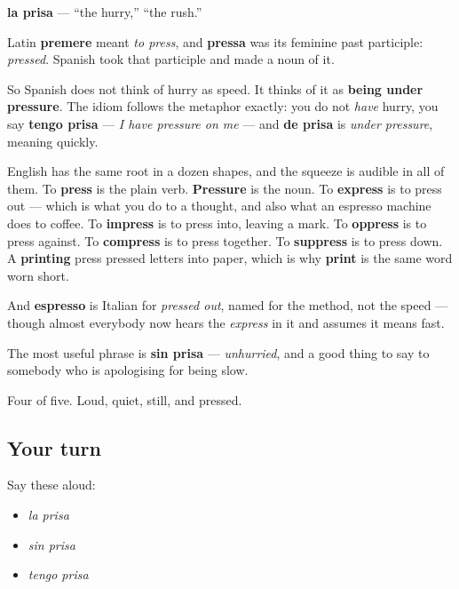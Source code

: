 \begin{cousinweb}
\textbf{la prisa} — \textquotedblleft{}the hurry,\textquotedblright{} \textquotedblleft{}the rush.\textquotedblright{}

Latin \textbf{premere} meant \emph{to press}, and \textbf{pressa} was its feminine past participle: \emph{pressed}. Spanish took that participle and made a noun of it.

So Spanish does not think of hurry as speed. It thinks of it as \textbf{being under pressure}. The idiom follows the metaphor exactly: you do not \emph{have} hurry, you say \textbf{tengo prisa} — \emph{I have pressure on me} — and \textbf{de prisa} is \emph{under pressure}, meaning quickly.

English has the same root in a dozen shapes, and the squeeze is audible in all of them. To \textbf{press} is the plain verb. \textbf{Pressure} is the noun. To \textbf{express} is to press out — which is what you do to a thought, and also what an espresso machine does to coffee. To \textbf{impress} is to press into, leaving a mark. To \textbf{oppress} is to press against. To \textbf{compress} is to press together. To \textbf{suppress} is to press down. A \textbf{printing} press pressed letters into paper, which is why \textbf{print} is the same word worn short.

And \textbf{espresso} is Italian for \emph{pressed out}, named for the method, not the speed — though almost everybody now hears the \emph{express} in it and assumes it means fast.

The most useful phrase is \textbf{sin prisa} — \emph{unhurried}, and a good thing to say to somebody who is apologising for being slow.
\end{cousinweb}

\begin{grammarlens}[title={What you've built}]
Four of five. Loud, quiet, still, and pressed.
\end{grammarlens}

\subsection*{Your turn}
Say these aloud:

\begin{itemize}
\raggedright
  \item \emph{la prisa}
  \item \emph{sin prisa}
  \item \emph{tengo prisa}
\end{itemize}

